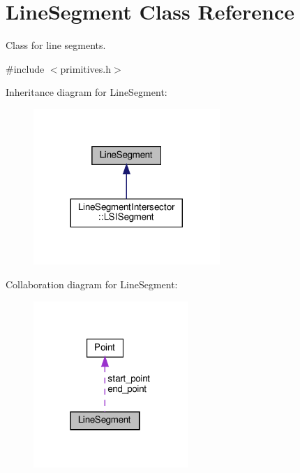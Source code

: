 \hypertarget{classLineSegment}{}\section{Line\+Segment Class Reference}
\label{classLineSegment}


Class for line segments.  




{\ttfamily \#include $<$primitives.\+h$>$}



Inheritance diagram for Line\+Segment\+:
\nopagebreak
\begin{figure}[H]
\begin{center}
\leavevmode
\includegraphics[width=200pt]{classLineSegment__inherit__graph}
\end{center}
\end{figure}


Collaboration diagram for Line\+Segment\+:
\nopagebreak
\begin{figure}[H]
\begin{center}
\leavevmode
\includegraphics[width=166pt]{classLineSegment__coll__graph}
\end{center}
\end{figure}
